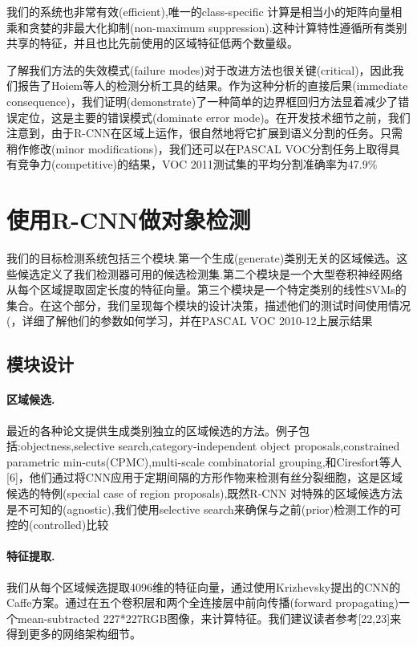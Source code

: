 \documentclass[a4paper,UTF8]{ctexart}
\theoremstyle{definition}
\begin{document}
我们的系统也非常有效(efficient),唯一的class-specific 计算是相当小的矩阵向量相乘和贪婪的非最大化抑制(non-maximum suppression).这种计算特性遵循所有类别共享的特征，并且也比先前使用的区域特征低两个数量级。

了解我们方法的失效模式(failure modes)对于改进方法也很关键(critical)，因此我们报告了Hoiem等人的检测分析工具的结果。作为这种分析的直接后果(immediate consequence)，我们证明(demonstrate)了一种简单的边界框回归方法显着减少了错误定位，这是主要的错误模式(dominate error mode)。在开发技术细节之前，我们注意到，由于R-CNN在区域上运作，很自然地将它扩展到语义分割的任务。只需稍作修改(minor modifications)，我们还可以在PASCAL VOC分割任务上取得具有竞争力(competitive)的结果，VOC 2011测试集的平均分割准确率为47.9\%
\section{使用R-CNN做对象检测}
我们的目标检测系统包括三个模块.第一个生成(generate)类别无关的区域候选。这些候选定义了我们检测器可用的候选检测集.第二个模块是一个大型卷积神经网络从每个区域提取固定长度的特征向量。第三个模块是一个特定类别的线性SVMs的集合。在这个部分，我们呈现每个模块的设计决策，描述他们的测试时间使用情况(，详细了解他们的参数如何学习，并在PASCAL VOC 2010-12上展示结果
\subsection{模块设计}
\paragraph{区域候选.} 最近的各种论文提供生成类别独立的区域候选的方法。例子包括:objectness,selective search,category-independent object proposals,constrained parametric min-cuts(CPMC),multi-scale combinatorial grouping,和Ciresfort等人 [6]，他们通过将CNN应用于定期间隔的方形作物来检测有丝分裂细胞，这是区域候选的特例(special case of region proposals),既然R-CNN 对特殊的区域候选方法是不可知的(agnostic),我们使用selective search来确保与之前(prior)检测工作的可控的(controlled)比较
\paragraph{特征提取.} 我们从每个区域候选提取4096维的特征向量，通过使用Krizhevsky提出的CNN的Caffe方案。通过在五个卷积层和两个全连接层中前向传播(forward propagating)一个mean-subtracted 227*227RGB图像，来计算特征。我们建议读者参考[22,23]来得到更多的网络架构细节。
\end{document}
